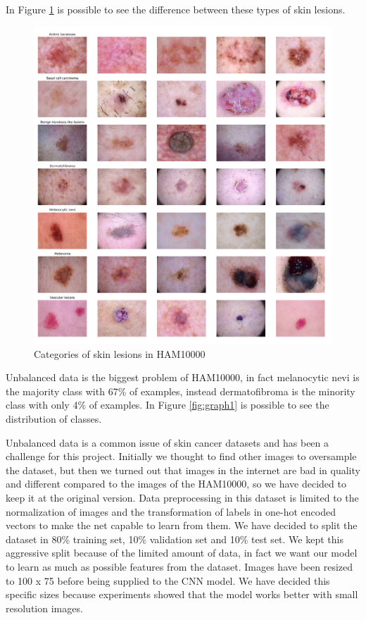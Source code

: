 	In Figure \ref{fig:category_samples} is possible to see the difference between these types of skin lesions.
	
	\begin{figure}[H]
		\centering
		\includegraphics[width=15cm]{images/category_samples.png}
		\caption{Categories of skin lesions in HAM10000}
		\label{fig:category_samples}
	\end{figure}
	
	Unbalanced data is the biggest problem of HAM10000, in fact melanocytic nevi is the majority class with 67\% of examples, instead dermatofibroma is the minority class with only 4\% of examples. In Figure \ref{fig:graph1} is possible to see the distribution of classes. 
	
	\smallskip
	
	Unbalanced data is a common issue of skin cancer datasets and has been a challenge for this project. Initially we thought to find other images to oversample the dataset, but then we turned out that images in the internet are bad in quality and different compared to the images of the HAM10000, so we have decided to keep it at the original version.
	Data preprocessing in this dataset is limited to the normalization of images and the transformation of labels in one-hot encoded vectors to make the net capable to learn from them. We have decided to split the dataset in 80\% training set, 10\% validation set and 10\% test set. We kept this aggressive split because of the limited amount of data, in fact we want our model to learn as much as possible features from the dataset. Images have been resized to 100 x 75 before being supplied to the CNN model. We have decided this specific sizes because experiments showed that the model works better with small resolution images.
	
